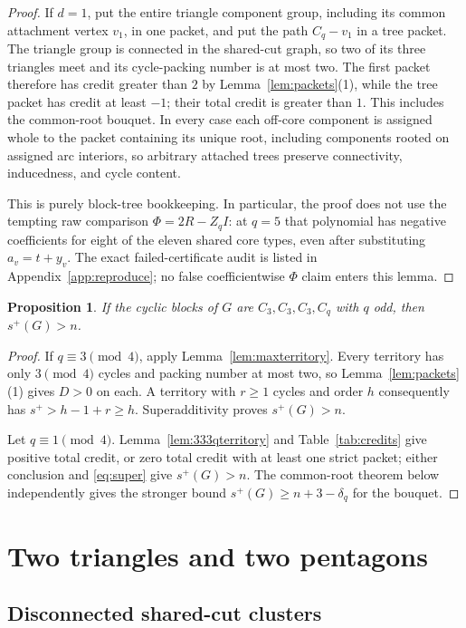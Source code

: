 \documentclass[11pt]{article}
\newtheorem{proposition}[theorem]{Proposition}
\theoremstyle{remark}
\begin{document}
\begin{proof}
If $d=1$, put the entire triangle component group, including its common
attachment vertex $v_1$, in one packet, and put the path $C_q-v_1$ in a tree
packet.  The triangle group is connected in the shared-cut graph, so two of
its three triangles meet and its cycle-packing number is at most two.  The
first packet therefore has credit greater than $2$ by
Lemma~\ref{lem:packets}(1), while the tree packet has credit at least $-1$;
their total credit is greater than $1$.  This includes the common-root
bouquet.  In every case each off-core component is assigned whole to the
packet containing its unique root, including components rooted on assigned
arc interiors, so arbitrary attached trees preserve connectivity, inducedness,
and cycle content.

This is purely block-tree bookkeeping.  In particular, the proof does not use the
tempting raw comparison $\Phi=2R-Z_qI$: at $q=5$ that polynomial has negative
coefficients for eight of the eleven shared core types, even after substituting
$a_v=t+y_v$.  The exact failed-certificate audit is listed in
Appendix~\ref{app:reproduce}; no false coefficientwise $\Phi$ claim enters
this lemma.
\end{proof}

\begin{proposition}\label{prop:333q}
If the cyclic blocks of $G$ are $C_3,C_3,C_3,C_q$ with $q$ odd, then
$s^+(G)>n$.
\end{proposition}

\begin{proof}
If $q\equiv3\pmod4$, apply Lemma~\ref{lem:maxterritory}.  Every territory has
only $3\pmod4$ cycles and packing number at most two, so
Lemma~\ref{lem:packets}(1) gives $D>0$ on each.  A territory with $r\geq1$
cycles and order $h$ consequently has
$s^+>h-1+r\geq h$.  Superadditivity proves $s^+(G)>n$.

Let $q\equiv1\pmod4$.  Lemma~\ref{lem:333qterritory} and
Table~\ref{tab:credits} give positive total credit, or zero total credit with
at least one strict packet; either conclusion and \eqref{eq:super} give
$s^+(G)>n$.  The common-root theorem below independently gives the stronger
bound $s^+(G)\geq n+3-\delta_q$ for the bouquet.
\end{proof}

\section{Two triangles and two pentagons}

\subsection{Disconnected shared-cut clusters}
\end{document}
